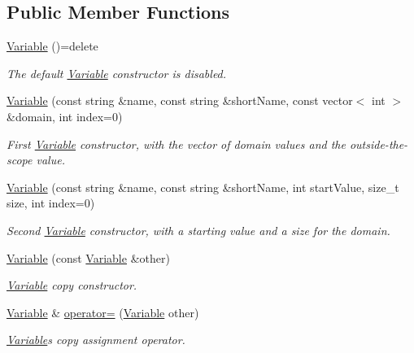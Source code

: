 \subsection*{Public Member Functions}
\begin{DoxyCompactItemize}
\item 
\hyperlink{classghost_1_1Variable_a41d27734b85f60c2e5fda7ee0ab5c600}{Variable} ()=delete
\begin{DoxyCompactList}\small\item\em The default \hyperlink{classghost_1_1Variable}{Variable} constructor is disabled. \end{DoxyCompactList}\item 
\hyperlink{classghost_1_1Variable_aa5dc881b8a239206bf55d018cc4a2156}{Variable} (const string \&name, const string \&short\+Name, const vector$<$ int $>$ \&domain, int index=0)
\begin{DoxyCompactList}\small\item\em First \hyperlink{classghost_1_1Variable}{Variable} constructor, with the vector of domain values and the outside-\/the-\/scope value. \end{DoxyCompactList}\item 
\hyperlink{classghost_1_1Variable_abae563e3f8ac3cc0f81b8736ae86d5b8}{Variable} (const string \&name, const string \&short\+Name, int start\+Value, size\+\_\+t size, int index=0)
\begin{DoxyCompactList}\small\item\em Second \hyperlink{classghost_1_1Variable}{Variable} constructor, with a starting value and a size for the domain. \end{DoxyCompactList}\item 
\hyperlink{classghost_1_1Variable_ac9fb0513e1d15a047816821e034589ea}{Variable} (const \hyperlink{classghost_1_1Variable}{Variable} \&other)
\begin{DoxyCompactList}\small\item\em \hyperlink{classghost_1_1Variable}{Variable} copy constructor. \end{DoxyCompactList}\item 
\hyperlink{classghost_1_1Variable}{Variable} \& \hyperlink{classghost_1_1Variable_ad82b892892c3531cc3d54d6b5d048bf6}{operator=} (\hyperlink{classghost_1_1Variable}{Variable} other)
\begin{DoxyCompactList}\small\item\em \hyperlink{classghost_1_1Variable}{Variable}\textquotesingle{}s copy assignment operator. \end{DoxyCompactList}\item 

\end{DoxyCompactItemize}
